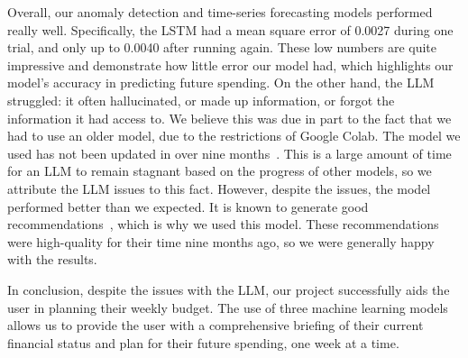 \documentclass{article}[12pt]
\begin{document}
Overall, our anomaly detection and time-series forecasting models performed really well. Specifically, the LSTM had a mean square error of 0.0027 during one trial, and only up to 0.0040 after running again. These low numbers are quite impressive and demonstrate how little error our model had, which highlights our model’s accuracy in predicting future spending. On the other hand, the LLM struggled: it often hallucinated, or made up information, or forgot the information it had access to. We believe this was due in part to the fact that we had to use an older model, due to the restrictions of Google Colab. The model we used has not been updated in over nine months~\cite{huggingfaceGemma2b}. This is a large amount of time for an LLM to remain stagnant based on the progress of other models, so we attribute the LLM issues to this fact. However, despite the issues, the model performed better than we expected. It is known to generate good recommendations~\cite{geeksforgeeks2024gemma}, which is why we used this model. These recommendations were high-quality for their time nine months ago, so we were generally happy with the results.

In conclusion, despite the issues with the LLM, our project successfully aids the user in planning their weekly budget. The use of three machine learning models allows us to provide the user with a comprehensive briefing of their current financial status and plan for their future spending, one week at a time.




\end{document}
